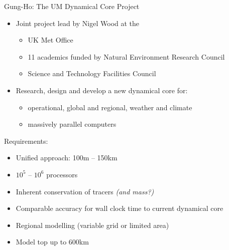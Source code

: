 \begin{frame}
\begin{block}{Gung-Ho: The UM Dynamical Core Project}

\begin{itemize}
\pause
\item Joint project lead by Nigel Wood at the
    \begin{itemize}
    \item UK Met Office
    \item 11 academics funded by Natural Environment Research Council
    \item Science and Technology Facilities Council
    \end{itemize}
\pause
\item Research, design and develop a new dynamical core for:
    \begin{itemize}
    \item operational, global and regional, weather and climate
    \item massively parallel computers
    \end{itemize}
\end{itemize}
\end{block}
\pause
\begin{block}{Requirements:}
\pause
\begin{itemize}
\item Unified approach: 100m -- 150km
\item $10^5$ -- $10^6$ processors
\item Inherent conservation of tracers {\color{purple}\it (and mass?)}
\item Comparable accuracy for wall clock time to current dynamical core
\item Regional modelling (variable grid or limited area)
\item Model top up to 600km
\end{itemize}
\end{block}

\end{frame}

